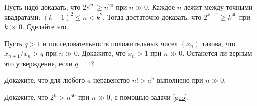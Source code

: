 \documentclass[a4paper,12pt]{article}
\begin{document}
Пусть надо доказать, что $2^{\sqrt n}\geq n^{20}$ при $n\gg0$. Каждое $n$ лежит между точными квадратами: $(k-1)^2\leq n<k^2$. Тогда достаточно доказать, что
$2^{k-1}\geq k^{40}$ при $k\gg0$. Сделайте это.

\vspace*{-5pt}
\vspace*{-7pt}








\label{geo}
Пусть $q>1$ и последовательность положительных чисел $(x_n)$ такова,
что $x_{n+1}/x_n>q$ при $n\gg0$. Докажите, что
$x_n>1$ при $n\gg0$. 
Останется ли верным это утверждение, если $q=1$?

 Докажите, что для любого $a$ неравенство $n!>a^n$ выполнено
при $n\gg 0$.


 Докажите, что $2^n>n^{50}$ при $n\gg0$, с помощью задачи \ref{geo}.





\end{document}
